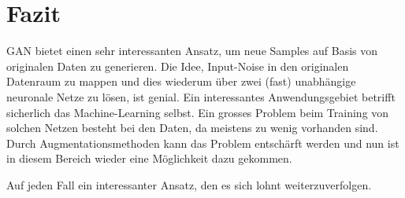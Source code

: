 \chapter{Fazit}
\Gls{GAN} bietet einen sehr interessanten Ansatz, um neue Samples auf Basis von originalen Daten zu generieren.
Die Idee, Input-Noise in den originalen Datenraum zu mappen und dies wiederum über zwei (fast) unabhängige
neuronale Netze zu lösen, ist genial.
Ein interessantes Anwendungsgebiet betrifft sicherlich das Machine-Learning selbst. Ein grosses Problem beim Training von
solchen Netzen besteht bei den Daten, da meistens zu wenig vorhanden sind.
Durch Augmentationsmethoden kann das Problem entschärft werden und nun ist in diesem Bereich wieder eine Möglichkeit
dazu gekommen.

Auf jeden Fall ein interessanter Ansatz, den es sich lohnt weiterzuverfolgen.